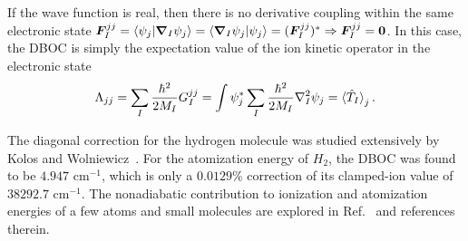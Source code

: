 If the wave function is real, then there is no derivative coupling within the same electronic state $\boldsymbol{F}_I^{jj}=\braket{\psi_j|\boldsymbol{\nabla}_I\psi_j} = \braket{\boldsymbol{\nabla}_I\psi_j|\psi_j} = (\boldsymbol{F}_I^{jj})^* \Rightarrow \boldsymbol{F}_I^{jj}=\boldsymbol{0}$. In this case, the DBOC is simply the expectation value of the ion kinetic operator in the electronic state
\begin{align}
\Lambda_{jj} = \sum_I \frac{\hbar^2}{2M_I}G_I^{jj} = \int \psi_j^* \sum_I \frac{\hbar^2}{2M_I} \nabla^2_I\psi_j = \braket{\hat{T}_I}_j.
\end{align}

The diagonal correction for the hydrogen molecule was studied extensively by Kolos and Wolniewicz~\cite{Kolos1964,Kolos1968,Wolniewicz1983}.
For the atomization energy of $H_2$, the DBOC was found to be $4.947$ cm$^{-1}$, which is only a $0.0129$\% correction of its clamped-ion value of $38292.7$ cm$^{-1}$.
The nonadiabatic contribution to ionization and atomization energies of a few atoms and small molecules are explored in Ref.~\cite{Yang2015} and references therein.
